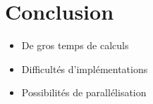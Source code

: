	\section{Conclusion}
		\begin{frame}
	 \begin{itemize}
        \item De gros temps de calculs \vspace{2em}
        \item Difficultés d'implémentations \vspace{2em}
        \item Possibilités de parallélisation \vspace{2em}
     \end{itemize}
		\end{frame}	
		


